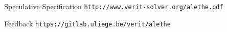 \documentclass[aspectratio=169,compress]{beamer}
\begin{document}
\begin{frame}[plain]
    \begin{columns}
        \begin{column}{0.28\textwidth}
        \end{column}
        \begin{column}{0.64\textwidth}
            \begin{block}{Speculative Specification}
                \texttt{http://www.verit-solver.org/alethe.pdf}
            \end{block}
            \begin{block}{Feedback}
                \texttt{https://gitlab.uliege.be/verit/alethe}
            \end{block}
        \end{column}
        \begin{column}{0.28\textwidth}
        \end{column}
    \end{columns}
\end{frame}
\end{document}
